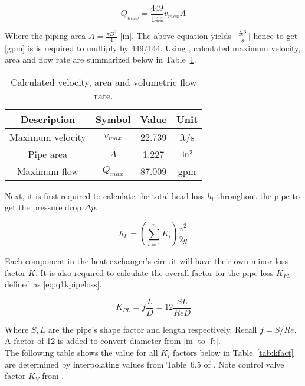 \begin{equation}
	\label{eq:flowq}
	Q_{max} =  \frac{449}{144} v_{max} A	
\end{equation} 

Where the piping area $ A = \frac{\pi D^2}{4}$ [in]. The above equation yields [$\,\mathrm{\frac{ft^3}{s}}$] hence to get [gpm] is is required to multiply by 449/144. Using \cite{excel}, calculated maximum velocity, area and flow rate are summarized below in Table~\ref{tab:q1ans1}.

\begin{table}[H]
  \centering
  \caption{Calculated velocity, area and volumetric flow rate.}
    \begin{tabular}{cccc}
    \toprule
    \textbf{Description} & \textbf{Symbol} & \textbf{Value } & \textbf{Unit} \\
    \midrule
    Maximum velocity	& $v_{max}$	& 22.739	& ft/s \\
    Pipe area 			& $A$     	& 1.227 	& $\,\mathrm{in^2}$ \\
    Maximum flow 		& $Q_{max}$	& 87.009 	& gpm \\
    \bottomrule
    \end{tabular}
  \label{tab:q1ans1}
\end{table}

Next, it is first required to calculate the total head loss $h_l$ throughout the pipe to get the pressure drop $\Delta p$.

\begin{equation}
	\label{eq:q1headloss}	
	h_L = \left( \sum_{i=1}^{n} K_i \right) \frac{v^2}{2g} 
\end{equation}

Each component in the heat exchanger's circuit will have their own minor loss factor $K$. It is also required to calculate the overall factor for the pipe loss $K_{PL}$ defined as \ref{eq:q1kpipeloss}.

\begin{equation}
	\label{eq:q1kpipeloss}	
	K_{PL} = f \frac{L}{D} = 12 \frac{SL}{Re D}
\end{equation}

Where $S,L$ are the pipe's shape factor and length respectively. Recall $f=S/Re$. A factor of 12 is added to convert diameter from [in] to [ft].\\

The following table shows the value for all $K_i$ factors below in Table~\ref{tab:kfact} are determined by interpolating values from Table~6.5 of \cite{fluids}. Note control valve factor $K_V$ from \cite{assign}.

